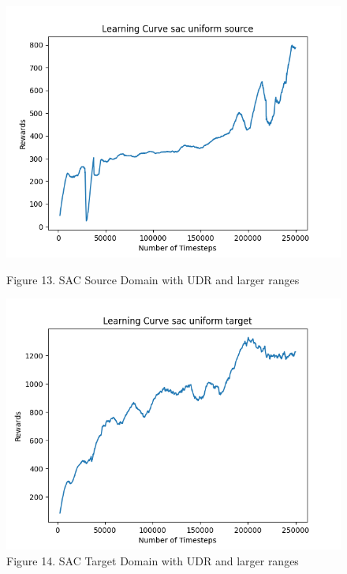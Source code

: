 \documentclass[12pt]{article}
\begin{document}
\begin{figure}[H]
    \centering
    \begin{minipage}{0.45\textwidth}
        \centering
        \includegraphics[width=\textwidth]{../images/Learning_Curve_SAC_Uniform_Large_Source.png}
        \caption{Figure 13. SAC Source Domain with UDR and larger ranges}
        \label{fig:sac_source_udr_larger}
    \end{minipage}
    \hfill
    \begin{minipage}{0.45\textwidth}
        \centering
        \includegraphics[width=\textwidth]{../images/Learning_Curve_SAC_Uniform_Large_Target.png}
        \caption{Figure 14. SAC Target Domain with UDR and larger ranges}
        \label{fig:sac_target_udr_larger}

\end{minipage}
\end{figure}
\end{document}
